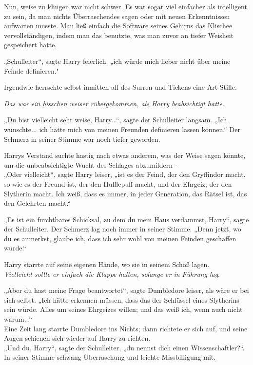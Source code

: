 {Nun, weise zu klingen war nicht schwer. Es war sogar viel einfacher als intelligent zu sein, da man nichts Überraschendes sagen oder mit neuen Erkenntnissen aufwarten musste. Man ließ einfach die Software seines Gehirns das Klischee vervollständigen, indem man das benutzte, was man zuvor an tiefer Weisheit gespeichert hatte.

„Schulleiter“, sagte Harry feierlich, „ich würde mich lieber nicht über meine Feinde definieren."

Irgendwie herrschte selbst inmitten all des Surren und Tickens eine Art Stille.

\emph{Das war ein bisschen weiser rübergekommen, als Harry beabsichtigt hatte.}

„Du bist vielleicht sehr weise, Harry...“, sagte der Schulleiter langsam. „Ich wünschte... ich hätte mich von meinen Freunden definieren lassen können.“ Der Schmerz in seiner Stimme war noch tiefer geworden.

Harrys Verstand suchte hastig nach etwas anderem, was der Weise sagen könnte, um die unbeabsichtigte Wucht des Schlages abzumildern -\\ „Oder vielleicht“, sagte Harry leiser, „ist es der Feind, der den Gryffindor macht, so wie es der Freund ist, der den Hufflepuff macht, und der Ehrgeiz, der den Slytherin macht. Ich weiß, dass es immer, in jeder Generation, das Rätsel ist, das den Gelehrten macht.“

„Es ist ein furchtbares Schicksal, zu dem du mein Haus verdammst, Harry“, sagte der Schulleiter. Der Schmerz lag noch immer in seiner Stimme. „Denn jetzt, wo du es anmerkst, glaube ich, dass ich sehr wohl von meinen Feinden geschaffen wurde.“

Harry starrte auf seine eigenen Hände, wo sie in seinem Schoß lagen.\\ \emph{Vielleicht sollte er einfach die Klappe halten, solange er in Führung lag}.

„Aber du hast meine Frage beantwortet“, sagte Dumbledore leiser, als wäre er bei sich selbst. „Ich hätte erkennen müssen, dass das der Schlüssel eines Slytherins sein würde. Alles um seines Ehrgeizes willen; und das weiß ich, wenn auch nicht warum...“\\ Eine Zeit lang starrte Dumbledore ins Nichts; dann richtete er sich auf, und seine Augen schienen sich wieder auf Harry zu richten.\\ „Und du, Harry“, sagte der Schulleiter, „du nennst dich einen Wissenschaftler?“.\\ In seiner Stimme schwang Überraschung und leichte Missbilligung mit.

}

